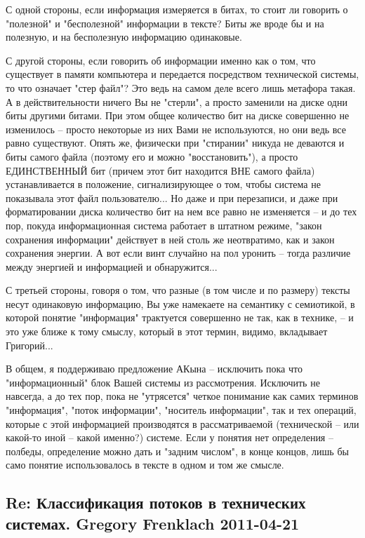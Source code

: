 \documentclass[a4paper,11pt]{article}
\begin{document}
С одной стороны, если информация измеряется в битах, то стоит ли говорить о
"полезной" и "бесполезной" информации в тексте? Биты же вроде бы и на
полезную, и на бесполезную информацию одинаковые.

С другой стороны, если говорить об информации именно как о том, что существует
в памяти компьютера и передается посредством технической системы, то что
означает "стер файл"? Это ведь на самом деле всего лишь метафора такая. А в
действительности ничего Вы не "стерли", а просто заменили на диске одни биты
другими битами. При этом общее количество бит на диске совершенно не
изменилось -- просто некоторые из них Вами не используются, но они ведь все
равно существуют. Опять же, физически при "стирании" никуда не деваются и биты
самого файла (поэтому его и можно "восстановить"), а просто ЕДИНСТВЕННЫЙ бит
(причем этот бит находится ВНЕ самого файла) устанавливается в положение,
сигнализирующее о том, чтобы система не показывала этот файл пользователю...
Но даже и при перезаписи, и даже при форматировании диска количество бит на
нем все равно не изменяется -- и до тех пор, покуда информационная система
работает в штатном режиме, "закон сохранения информации" действует в ней столь
же неотвратимо, как и закон сохранения энергии. А вот если винт случайно на
пол уронить -- тогда различие между энергией и информацией и обнаружится...

С третьей стороны, говоря о том, что разные (в том числе и по размеру) тексты
несут одинаковую информацию, Вы уже намекаете на семантику с семиотикой, в
которой понятие "информация" трактуется совершенно не так, как в технике, -- и
это уже ближе к тому смыслу, который в этот термин, видимо, вкладывает
Григорий...

В общем, я поддерживаю предложение АКына -- исключить пока что
"информационный" блок Вашей системы из рассмотрения. Исключить не навсегда, а
до тех пор, пока не "утрясется" четкое понимание как самих терминов
"информация", "поток информации", "носитель информации", так и тех операций,
которые с этой информацией производятся в рассматриваемой (технической -- или
какой-то иной -- какой именно?) системе. Если у понятия нет определения --
полбеды, определение можно дать и "задним числом", в конце концов, лишь бы
само понятие использовалось в тексте в одном и том же смысле.

\subsection*{Re: Классификация потоков в технических системах.  Gregory
  Frenklach 2011-04-21}
\end{document}
